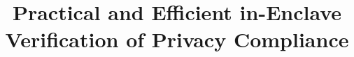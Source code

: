 \documentclass[conference]{IEEEtran}
\begin{document}
\title{Practical and Efficient in-Enclave Verification of Privacy Compliance}



%
\author{}



\maketitle



















%


%
%
\end{document}
